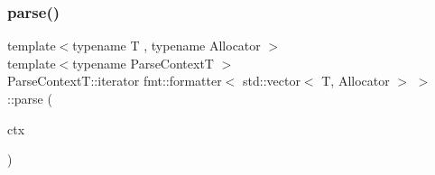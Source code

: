 \mbox{\label{structfmt_1_1formatter_3_01std_1_1vector_3_01_t_00_01_allocator_01_4_01_4_a18a2ffb66289d4dd0543bacdfa656aaf}} 
\subsubsection{\texorpdfstring{parse()}{parse()}}
{\footnotesize\ttfamily template$<$typename T , typename Allocator $>$ \\
template$<$typename Parse\+ContextT $>$ \\
Parse\+Context\+T\+::iterator fmt\+::formatter$<$ std\+::vector$<$ T, Allocator $>$ $>$\+::parse (\begin{DoxyParamCaption}\item[{Parse\+ContextT \&}]{ctx }\end{DoxyParamCaption})}

